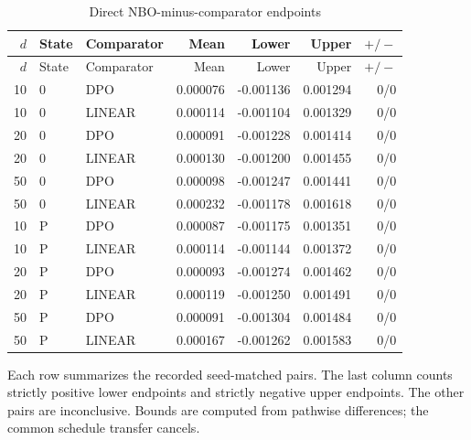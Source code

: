 \begingroup\small\setlength{\tabcolsep}{4pt}
\begin{longtable}{rllrrrr}
\caption{Direct NBO-minus-comparator endpoints}\label{tab:r12paired}\\
\toprule
$d$ & State & Comparator & Mean & Lower & Upper & $+/-$\\\midrule
\endfirsthead
\toprule
$d$ & State & Comparator & Mean & Lower & Upper & $+/-$\\\midrule
\endhead
10 & 0 & DPO & 0.000076 & -0.001136 & 0.001294 & 0/0\\
10 & 0 & LINEAR & 0.000114 & -0.001104 & 0.001329 & 0/0\\
20 & 0 & DPO & 0.000091 & -0.001228 & 0.001414 & 0/0\\
20 & 0 & LINEAR & 0.000130 & -0.001200 & 0.001455 & 0/0\\
50 & 0 & DPO & 0.000098 & -0.001247 & 0.001441 & 0/0\\
50 & 0 & LINEAR & 0.000232 & -0.001178 & 0.001618 & 0/0\\
10 & P & DPO & 0.000087 & -0.001175 & 0.001351 & 0/0\\
10 & P & LINEAR & 0.000114 & -0.001144 & 0.001372 & 0/0\\
20 & P & DPO & 0.000093 & -0.001274 & 0.001462 & 0/0\\
20 & P & LINEAR & 0.000119 & -0.001250 & 0.001491 & 0/0\\
50 & P & DPO & 0.000091 & -0.001304 & 0.001484 & 0/0\\
50 & P & LINEAR & 0.000167 & -0.001262 & 0.001583 & 0/0\\
\bottomrule\end{longtable}
\noindent Each row summarizes the recorded seed-matched pairs. The last column counts strictly positive lower endpoints and strictly negative upper endpoints. The other pairs are inconclusive. Bounds are computed from pathwise differences; the common schedule transfer cancels.
\endgroup
